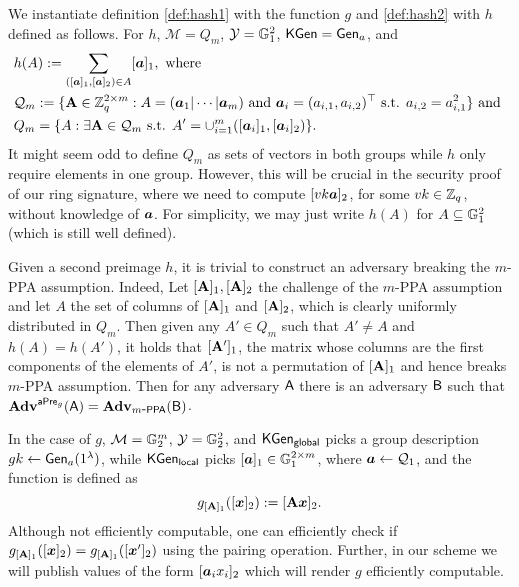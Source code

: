 
We instantiate definition \ref{def:hash1} with the function $g$ and \ref{def:hash2}  with $h$ defined as follows. For  $h$, $\mathcal{M}=Q_m$, $\mathcal{Y}=\mathbb{G}_1^2$, $\mathsf{KGen}=\mathsf{Gen}_a$, and
\begin{align*}
&h(A):= \sum_{([{\boldsymbol{a}}]_1,[{\boldsymbol{a}}]_2)\in A}[{\boldsymbol{a}}]_1, \text{ where}\\
&\mathcal{Q}_m := \{\mathbf{{A}}\in \mathbb{Z}_q^{2\times m}:A=({\boldsymbol{a}}_1|\cdots|{\boldsymbol{a}}_m) \text{ and } {\boldsymbol{a}}_i = (a_{i,1},a_{i,2})^\top \text{ s.t. } a_{i,2} = a_{i,1}^2\}\text{ and }\\
&Q_m = \{A : \exists \mathbf{{A}}\in\mathcal{Q}_m\text{ s.t. } A' = \cup_{i=1}^m([{\boldsymbol{a}}_i]_1,[{\boldsymbol{a}}_i]_2)\}.
\end{align*}
It might seem odd to define $Q_m$ as sets  of vectors in both groups while $h$ only require elements in one group. However, this will be crucial in the security proof of our ring signature, where we need to compute $[vk {\boldsymbol{a}}]_2$, for some $vk\in\mathbb{Z}_q$, without knowledge of ${\boldsymbol{a}}$. For simplicity, we may just write $h(A)$ for $A\subseteq \mathbb{G}_1^2$ (which is still well defined).

Given a second preimage $h$, it is trivial to construct an adversary breaking the $m$-PPA assumption. Indeed, Let $[\mathbf{{A}}]_1,[\mathbf{{A}}]_2$ the challenge of the $m$-PPA assumption and let $A$ the set of columns of $[\mathbf{{A}}]_1$ and $[\mathbf{{A}}]_2$, which is clearly uniformly distributed in $Q_m$. Then given any $A'\in Q_m$ such that $A'\neq A$ and $h(A)=h(A')$, it holds that $[\mathbf{{A}}']_1$, the matrix whose columns are the first components of the elements of $A'$, is not a permutation of $[\mathbf{{A}}]_1$ and hence breaks $m$-PPA assumption. Then for any adversary $\mathsf{A}$ there is an adversary $\mathsf{B}$ such that $\mathbf{Adv}^{\mathsf{aPre}_g}(\mathsf{A})=\mathbf{Adv}_{m\mbox{-}\mathsf{PPA}}(\mathsf{B})$. 

In the case of $g$, $\mathcal{M}=\mathbb{G}^m_2$, $\mathcal{Y}=\mathbb{G}_2^2$, and $\mathsf{KGen}_{\mathsf{global}}$ picks a group description $gk\gets\mathsf{Gen}_a(1^\lambda)$, while $\mathsf{KGen}_\mathsf{local}$ picks $[{\boldsymbol{a}}]_1\in\mathbb{G}^{2\times m}_1$, where ${\boldsymbol{a}}\gets\mathcal{Q}_1$, and the function is defined as
$$
g_{[\mathbf{{A}}]_1}([{\boldsymbol{x}}]_2):= [\mathbf{{A}}{\boldsymbol{x}}]_2.
$$
Although not efficiently computable, one can efficiently check if $g_{[\mathbf{{A}}]_1}([{\boldsymbol{x}}]_2) = g_{[\mathbf{{A}}]_1}([{\boldsymbol{x}}']_2)$ using the pairing operation. Further, in our scheme we will publish values of the form $[{\boldsymbol{a}}_ix_i]_2$ which will render $g$ efficiently computable.

